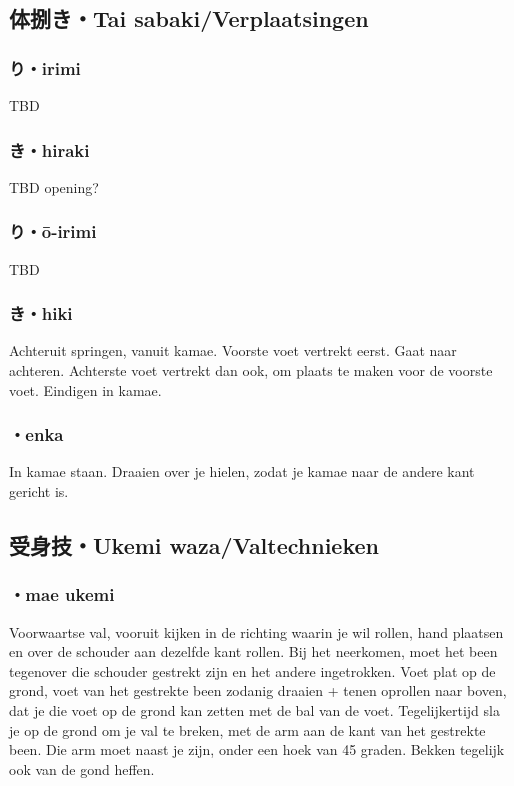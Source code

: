 \subsection{体捌き・Tai sabaki/Verplaatsingen}
\subsubsection{り・irimi}
TBD

\subsubsection{き・hiraki}
TBD opening?

\subsubsection{り・\={o}-irimi}
TBD

\subsubsection{き・hiki}
Achteruit springen, vanuit kamae. Voorste voet vertrekt eerst. Gaat naar achteren. Achterste voet vertrekt dan ook, om plaats te maken voor de voorste voet. Eindigen in kamae.

\subsubsection{\ruby{}{}・enka}
In kamae staan. Draaien over je hielen, zodat je kamae naar de andere kant gericht is.

\subsection{受身技・Ukemi waza/Valtechnieken}
\subsubsection{・mae ukemi}
Voorwaartse val, vooruit kijken in de richting waarin je wil rollen, hand plaatsen en over de schouder aan dezelfde kant rollen. Bij het neerkomen, moet het been tegenover die schouder gestrekt zijn en het andere ingetrokken. Voet plat op de grond, voet van het gestrekte been zodanig draaien + tenen oprollen naar boven, dat je die voet op de grond kan zetten met de bal van de voet. Tegelijkertijd sla je op de grond om je val te breken, met de arm aan de kant van het gestrekte been. Die arm moet naast je zijn, onder een hoek van 45 graden. Bekken tegelijk ook van de gond heffen.

